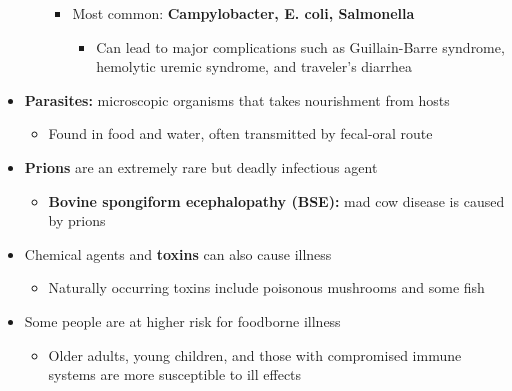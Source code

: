 \documentclass[12pt]{article}
\begin{document}
\begin{itemize}
\begin{itemize}
                            \begin{itemize}
                                \item Most common: \textbf{Campylobacter, E. coli, Salmonella}
                                    \begin{itemize}
                                        \item Can lead to major complications such as Guillain-Barre syndrome, hemolytic uremic syndrome, and traveler's diarrhea
                                    \end{itemize}
                            \end{itemize}
                    \end{itemize}
                \item \textbf{Parasites:} microscopic organisms that takes nourishment from hosts
                    \begin{itemize}
                        \item Found in food and water, often transmitted by fecal-oral route
                    \end{itemize}
                \item \textbf{Prions} are an extremely rare but deadly infectious agent
                    \begin{itemize}
                        \item \textbf{Bovine spongiform ecephalopathy (BSE):} mad cow disease is caused by prions
                    \end{itemize}
                \item Chemical agents and \textbf{toxins} can also cause illness
                    \begin{itemize}
                        \item Naturally occurring toxins include poisonous mushrooms and some fish
                    \end{itemize}
                \item Some people are at higher risk for foodborne illness
                    \begin{itemize}
                        \item Older adults, young children, and those with compromised immune systems are more susceptible to ill effects
                    \end{itemize}
            \end{itemize}
\end{document}
